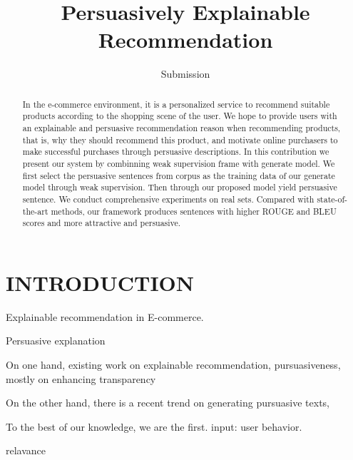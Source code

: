 \documentclass[sigconf]{acmart}
\begin{document}
\title{Persuasively Explainable Recommendation}

\author{Submission }


\begin{abstract}
In the e-commerce environment, it is a personalized service to recommend suitable products according to the shopping scene of the user. We hope to provide users with an explainable and persuasive recommendation reason when recommending products, that is, why they should recommend this product, and motivate online purchasers to make successful purchases through persuasive descriptions. In this contribution we present our system by combinning weak supervision frame with generate model.  We first select the persuasive sentences from corpus as the training data of our generate model through weak supervision. Then through our proposed model yield persuasive sentence. We conduct comprehensive experiments on real sets. Compared with state-of-the-art methods, our framework produces sentences with higher ROUGE and BLEU scores and more attractive and persuasive.

\end{abstract}



\maketitle

\section{INTRODUCTION}

Explainable recommendation in E-commerce. ~\cite{SIGIR}

Persuasive explanation

On one hand, existing work on explainable recommendation, pursuasiveness,  mostly on enhancing transparency 

On the other hand, there is a recent trend on generating pursuasive texts,

To the best of our knowledge, we are the first. input: user behavior. 

relavance
\end{document}

